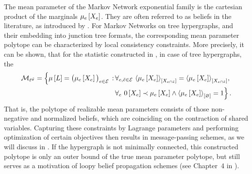 The mean parameter of the Markov Network exponential family is the cartesian product of the marginals $\mu_{e}\left[X_{e}\right]$.
They are often referred to as beliefs in the literature, as introduced by \cite{pearl_probabilistic_1988}.
For Markov Networks on tree hypergraphs, and their embedding into junction tree formats, the corresponding mean parameter polytope can be characterized by local consistency constraints.
More precisely, it can be shown, that for the statistic constructed in , in case of tree hypergraphs, the
\begin{align*}
    \mathcal{M}_{t^{\mathcal{G}}}
    = \Big\{ \mu\left[L\right]=\big(\mu_{e}\left[X_{e}\right]\big)_{e\in\mathcal{E}} \,:\,
    & \forall_{e,\tilde{e}\in\mathcal{E}} \,\, {
        \left\langle \mu_{e}\left[X_{e}\right]\right\rangle_{\left[ X_{e\cap\tilde{e}} \right]} = \left\langle \mu_{e}\left[X_{e}\right]\right\rangle_{\left[ X_{e\cap\tilde{e}} \right]}}, \\
    & \forall_{e} \,\, {0\left[X_{e}\right] \prec \mu_{e}\left[X_{e}\right] \land \left\langle \mu_{e}\left[X_{e}\right]\right\rangle_{\left[ \varnothing \right]}=1} \Big\} \, .
\end{align*}
That is, the polytope of realizable mean parameters consists of those non-negative and normalized beliefs, which are coinciding on the contraction of shared variables.
Capturing these constraints by Lagrange parameters and performing optimization of certain objectives then results in message-passing schemes, as we will discuss in .
If the hypergraph is not minimally connected, this constructed polytope is only an outer bound of the true mean parameter polytope, but still serves as a motivation of loopy belief propagation schemes (see Chapter~4 in \cite{wainwright_graphical_2008}).



\label{sec:mintermExpFamily}

